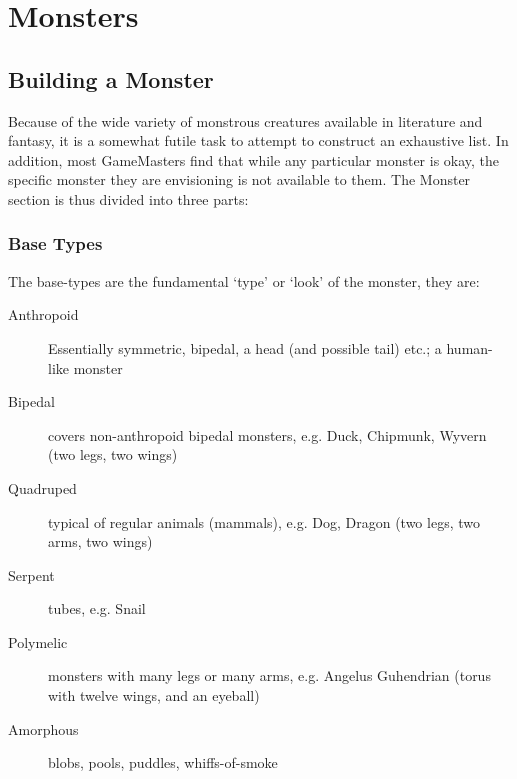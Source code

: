 \documentclass[twoside]{book}
\begin{document}
    

\chapter{Monsters}
    
    

\section{Building a Monster}
    
    {  
    Because of the wide variety of monstrous creatures
             available in literature and fantasy, it is a somewhat futile
             task to attempt to construct an exhaustive list. In
             addition, most GameMasters find that while any particular
             monster is okay, the specific monster they are envisioning
             is not available to them. The Monster section is thus
             divided into three parts: 
    }
  
\begin{description}
    
  \item[] 
  \item[] 
  \item[] 
\end{description}
  
    

\subsection{Base Types}
    
    {  
    The base-types are the fundamental
               `type' or `look' of the monster,
               they are: 
    }
  
\begin{description}
    
  \item[Anthropoid] 
    {  
    Essentially symmetric,
                 bipedal, a head (and possible tail) etc.; a human-like
                 monster 
    }
  
  \item[Bipedal] 
    {  
    covers non-anthropoid
                 bipedal monsters, e.g. Duck, Chipmunk, Wyvern (two legs,
                 two wings) 
    }
  
  \item[Quadruped] 
    {  
    typical of regular
                 animals (mammals), e.g. Dog, Dragon (two legs, two arms,
                 two wings) 
    }
  
  \item[Serpent] 
    {  
    tubes, e.g. Snail
    }
  
  \item[Polymelic] 
    {  
    monsters with many legs
                 or many arms, e.g. Angelus Guhendrian (torus with twelve
                 wings, and an eyeball)
    }
  
  \item[Amorphous] 
    {  
    blobs, pools, puddles,
                 whiffs-of-smoke 
    }
  
\end{description}
  
\end{document}
